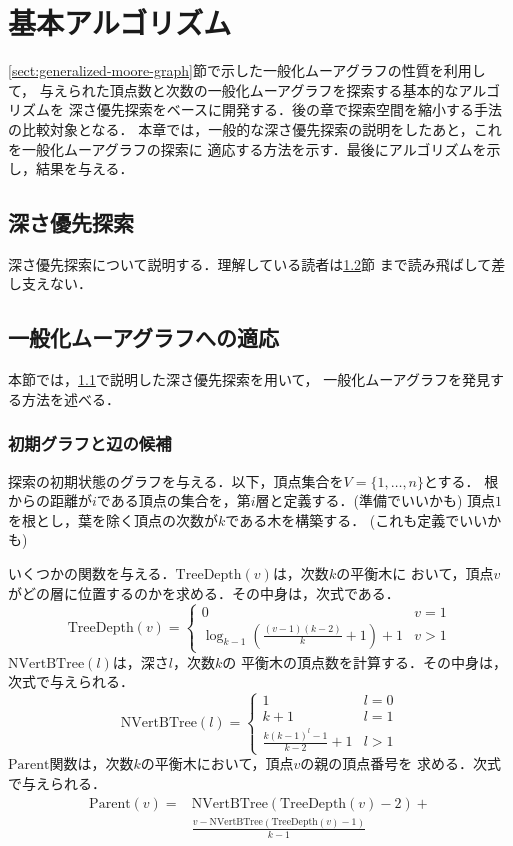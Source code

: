 
\chapter{基本アルゴリズム}
\label{chap:basic-algorithm}
\ref{sect:generalized-moore-graph}節で示した一般化ムーアグラフの性質を利用して，
与えられた頂点数と次数の一般化ムーアグラフを探索する基本的なアルゴリズムを
深さ優先探索をベースに開発する．後の章で探索空間を縮小する手法の比較対象となる．
本章では，一般的な深さ優先探索の説明をしたあと，これを一般化ムーアグラフの探索に
適応する方法を示す．最後にアルゴリズムを示し，結果を与える．

\section{深さ優先探索}
\label{sect:depth-first-search}
深さ優先探索について説明する．理解している読者は\ref{sect:apply-to-gmg}節
まで読み飛ばして差し支えない．

\section{一般化ムーアグラフへの適応}
\label{sect:apply-to-gmg}
本節では，\ref{sect:depth-first-search}で説明した深さ優先探索を用いて，
一般化ムーアグラフを発見する方法を述べる．

\subsection{初期グラフと辺の候補}
\label{subsect:initial-graph}
探索の初期状態のグラフを与える．以下，頂点集合を$V=\{1,\ldots,n\}$とする．
根からの距離が$i$である頂点の集合を，第$i$層と定義する．(準備でいいかも)
頂点$1$を根とし，葉を除く頂点の次数が$k$である木を構築する．
(これも定義でいいかも)

\begin{definition}
  いくつかの関数を与える．$\mathrm{TreeDepth}(v)$は，次数$k$の平衡木に
  おいて，頂点$v$がどの層に位置するのかを求める．その中身は，次式である．
  \[ \mathrm{TreeDepth}(v) = \begin{cases}
    0 & v = 1 \\
    \log_{k-1}{(\frac{(v-1)(k-2)}{k}+1)} + 1 & v > 1
  \end{cases} \]
  $\mathrm{NVertBTree}(l)$は，深さ$l$，次数$k$の
  平衡木の頂点数を計算する．その中身は，次式で与えられる．
  \[ \mathrm{NVertBTree}(l) = \begin{cases}
    1 & l = 0 \\
    k + 1 & l = 1 \\
    \frac{k(k-1)^l-1}{k-2} + 1 & l > 1
  \end{cases} \]
  $\mathrm{Parent}$関数は，次数$k$の平衡木において，頂点$v$の親の頂点番号を
  求める．次式で与えられる．
  \begin{align*}
    \mathrm{Parent}(v)=&\mathrm{NVertBTree}(\mathrm{TreeDepth}(v)-2) +\\
    &\frac{v-\mathrm{NVertBTree}(\mathrm{TreeDepth}(v)-1)}{k-1}
  \end{align*}
\end{definition}

